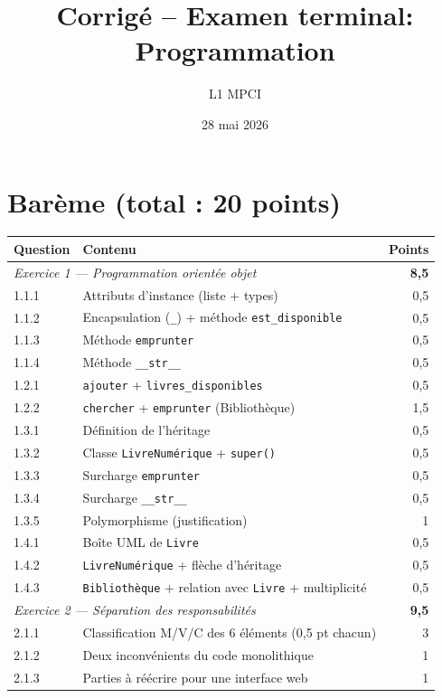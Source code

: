 \documentclass{article}
\title{Corrigé -- Examen terminal: Programmation}
\author{L1 MPCI}
\date{28 mai 2026}
\theoremstyle{exostyle}
\theoremstyle{partiestyle}
\theoremstyle{questionstyle}
\begin{document}
\maketitle

\section*{Barème (total : 20 points)}

\begin{center}
\begin{tabular}{llr}
\toprule
\textbf{Question} & \textbf{Contenu} & \textbf{Points} \\
\midrule
\multicolumn{2}{l}{\textit{Exercice 1 — Programmation orientée objet}} & \textbf{8,5} \\
\midrule
1.1.1 & Attributs d'instance (liste + types) & 0,5 \\
1.1.2 & Encapsulation (\texttt{\_}) + méthode \texttt{est\_disponible} & 0,5 \\
1.1.3 & Méthode \texttt{emprunter} & 0,5 \\
1.1.4 & Méthode \texttt{\_\_str\_\_} & 0,5 \\
1.2.1 & \texttt{ajouter} + \texttt{livres\_disponibles} & 0,5 \\
1.2.2 & \texttt{chercher} + \texttt{emprunter} (Bibliothèque) & 1,5 \\
1.3.1 & Définition de l'héritage & 0,5 \\
1.3.2 & Classe \texttt{LivreNumérique} + \texttt{super()} & 0,5 \\
1.3.3 & Surcharge \texttt{emprunter} & 0,5 \\
1.3.4 & Surcharge \texttt{\_\_str\_\_} & 0,5 \\
1.3.5 & Polymorphisme (justification) & 1 \\
1.4.1 & Boîte UML de \texttt{Livre} & 0,5 \\
1.4.2 & \texttt{LivreNumérique} + flèche d'héritage & 0,5 \\
1.4.3 & \texttt{Bibliothèque} + relation avec \texttt{Livre} + multiplicité & 0,5 \\
\midrule
\multicolumn{2}{l}{\textit{Exercice 2 — Séparation des responsabilités}} & \textbf{9,5} \\
\midrule
2.1.1 & Classification M/V/C des 6 éléments (0,5 pt chacun) & 3 \\
2.1.2 & Deux inconvénients du code monolithique & 1 \\
2.1.3 & Parties à réécrire pour une interface web & 1 \\

\end{tabular}
\end{center}
\end{document}
